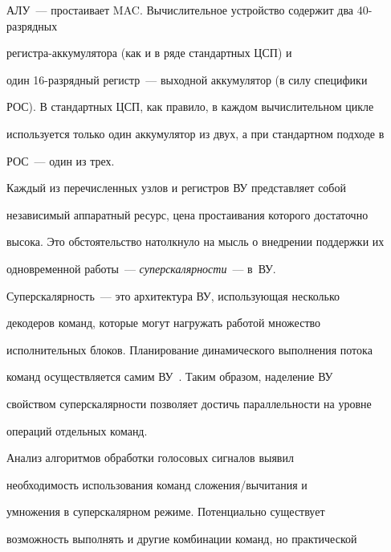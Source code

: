 АЛУ~--- простаивает MAC. Вычислительное устройство содержит два 40-раз\-ряд\-ных 


      ре\-гист\-ра-ак\-ку\-му\-ля\-то\-ра (как и в ряде стандартных ЦСП) и 


один 16-раз\-ряд\-ный регистр~--- выходной аккумулятор (в силу специфики 


РОС). В стандартных ЦСП, как правило, в каждом вычислительном цикле 


используется только один аккумулятор из двух, а при стандартном подходе в 


РОС~--- один из трех.


{ %





}


      


      Каждый из перечисленных узлов и регистров ВУ пред\-став\-ля\-ет собой 


независимый аппаратный ресурс, цена простаивания которого достаточно 


высока. Это обстоятельство натолкнуло на мысль о внедрении поддержки их 


одновременной работы~--- \textit{суперскалярности}~--- в~ВУ.


      


      Суперскалярность~--- это архитектура ВУ, использующая несколько 


декодеров команд, которые могут нагружать работой множество 


исполнительных блоков. Планирование динамического выполнения потока 


команд осуществляется самим ВУ~\cite{4-3}. Таким образом, наделение ВУ 


свойством суперскалярности позволяет достичь параллельности на уровне 


операций отдельных команд.


      


      Анализ алгоритмов обработки голосовых сигналов выявил 


необходимость использования команд сло\-же\-ния/вы\-чи\-та\-ния и\linebreak 


умножения в суперскалярном режиме. Потенциально су\-ще\-ст\-ву\-ет 


возможность выполнять и другие комбинации команд, но практической 


